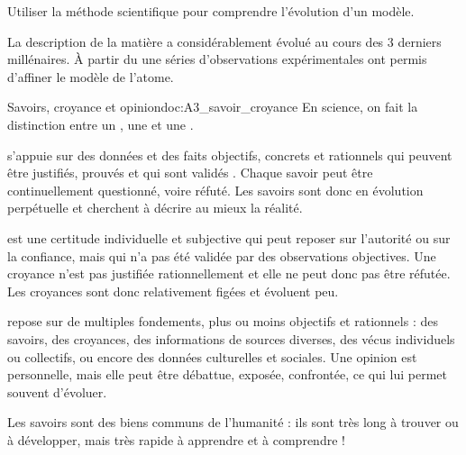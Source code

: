 \teteSndAtom



\begin{objectifs}
  \item Utiliser la méthode scientifique pour comprendre l'évolution d'un modèle.
\end{objectifs}

\begin{contexte}
  La description de la matière a considérablement évolué au cours des 3 derniers millénaires.
  À partir du  une séries d'observations expérimentales ont permis d'affiner le modèle de l'atome.
  
\end{contexte}


\begin{doc}{Savoirs, croyance et opinion}{doc:A3_savoir_croyance}
  En science, on fait la distinction entre un , une  et une .

  \begin{listePoints}
    \item
     s'appuie sur des données et des faits objectifs, concrets et rationnels qui peuvent être justifiés, prouvés et qui sont validés .
    Chaque savoir peut être continuellement questionné, voire réfuté.
    Les savoirs sont donc en évolution perpétuelle et cherchent à décrire au mieux la réalité.
 
    \item 
     est une certitude individuelle et subjective qui peut reposer sur l'autorité ou sur la confiance, mais qui n'a pas été validée par des observations objectives.
    Une croyance n'est pas justifiée rationnellement et elle ne peut donc pas être réfutée.
    Les croyances sont donc relativement figées et évoluent peu.
  
    \item
     repose sur de multiples fondements, plus ou moins objectifs et rationnels : des savoirs, des croyances, des informations de sources diverses, des vécus individuels ou collectifs, ou encore des données culturelles et sociales.
    Une opinion est personnelle, mais elle peut être débattue, exposée, confrontée, ce qui lui permet souvent d'évoluer.
  \end{listePoints}

  Les savoirs sont des biens communs de l'humanité : ils sont très long à trouver ou à développer, mais très rapide à apprendre et à comprendre !
\end{doc}


